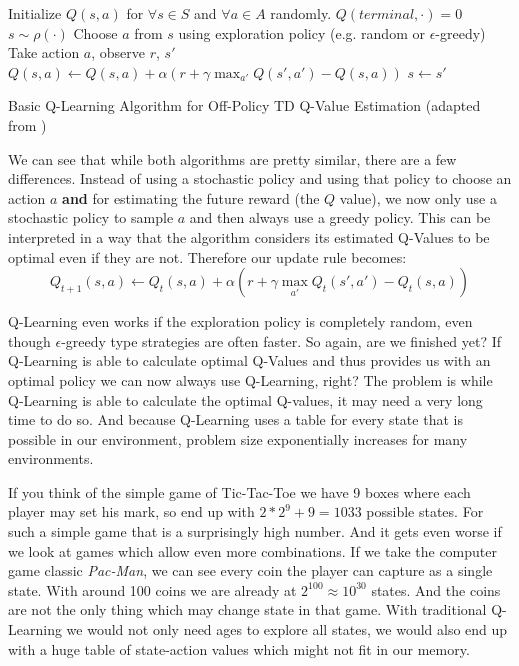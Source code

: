 \begin{algorithm}[ht]
  Initialize $Q(s, a)$ for $\forall s \in S$ and $\forall a \in A$ randomly. $Q(terminal, \cdot) = 0$ \;
   {
   $s \sim \rho(\cdot)$ \;
     {
    Choose $a$ from $s$ using exploration policy (e.g. random or $\epsilon$-greedy) \;
     Take action $a$, observe $r$, $s'$ \;
     $Q(s, a) \leftarrow Q(s, a) + \alpha (r + \gamma\max_{a'} Q(s', a') - Q(s, a))$ \;
     $s \leftarrow s'$\;
   }
 }
  \caption[The Q-Learning Algorithm]{Basic Q-Learning Algorithm for Off-Policy TD Q-Value Estimation (adapted from \cite{sutton2018reinforcement})}\label{alg:QLearning}
 \end{algorithm}

We can see that while both algorithms are pretty similar, there are a few differences. Instead of using a stochastic policy and using that policy to choose an action $a$ \textbf{and} for estimating the future reward (the $Q$ value), we now only use a stochastic policy to sample $a$ and then always use a greedy policy. This can be interpreted in a way that the algorithm considers its estimated Q-Values to be optimal even if they are not. Therefore our update rule becomes: 
\[Q_{t+1}(s, a) \leftarrow Q_t(s, a) + \alpha (r + \gamma\max_{a'} Q_t(s', a') - Q_t(s, a))\]

Q-Learning even works if the exploration policy is completely random, even though $\epsilon$-greedy type strategies are often faster. So again, are we finished yet? If Q-Learning is able to calculate optimal Q-Values and thus provides us with an optimal policy we can now always use Q-Learning, right? The problem is while Q-Learning is able to calculate the optimal Q-values, it may need a very long time to do so. And because Q-Learning uses a table for every state that is possible in our environment, problem size exponentially increases for many environments.

If you think of the simple game of Tic-Tac-Toe we have 9 boxes where each player may set his mark, so end up with $2*2^9+9=1033$ possible states. For such a simple game that is a surprisingly high number. And it gets even worse if we look at games which allow even more combinations. If we take the computer game classic \textit{Pac-Man}, we can see every coin the player can capture as a single state. With around 100 coins we are already at $2^{100} \approx 10^{30}$ states. And the coins are not the only thing which may change state in that game. With traditional Q-Learning we would not only need ages to explore all states, we would also end up with a huge table of state-action values which might not fit in our memory.

